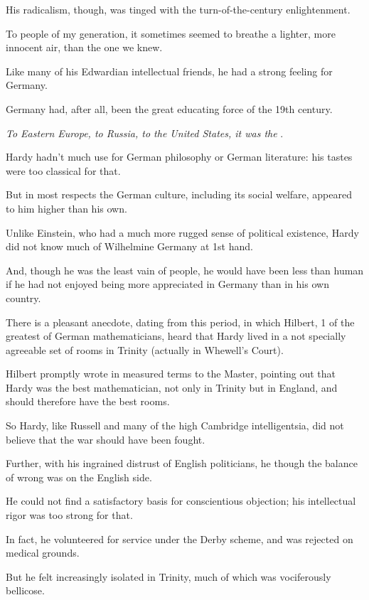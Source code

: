 \documentclass{article}
\numberwithin{equation}{section}
\begin{document}
His radicalism, though, was tinged with the turn-of-the-century enlightenment.

To people of my generation, it sometimes seemed to breathe a lighter, more innocent air, than the one we knew.

%
Like many of his Edwardian intellectual friends, he had a strong feeling for Germany.

Germany had, after all, been the great educating force of the 19th century.

\textit{To Eastern Europe, to Russia, to the United States, it was the }.

Hardy hadn't much use for German philosophy or German literature: his tastes were too classical for that.

But in most respects the German culture, including its social welfare, appeared to him higher than his own.

%
Unlike Einstein, who had a much more rugged sense of political existence, Hardy did not know much of Wilhelmine Germany at 1st hand.

And, though he was the least vain of people, he would have been less than human if he had not enjoyed being more appreciated in Germany than in his own country.

There is a pleasant anecdote, dating from this period, in which Hilbert, 1 of the greatest of German mathematicians, heard that Hardy lived in a not specially agreeable set of rooms in Trinity (actually in Whewell's Court).

Hilbert promptly wrote in measured terms to the Master, pointing out that Hardy was the best mathematician, not only in Trinity but in England, and should therefore have the best rooms.

%
So Hardy, like Russell and many of the high Cambridge intelligentsia, did not believe that the war should have been fought.

Further, with his ingrained distrust of English politicians, he though the balance of wrong was on the English side.

He could not find a satisfactory basis for conscientious objection; his intellectual rigor was too strong for that.

In fact, he volunteered for service under the Derby scheme, and was rejected on medical grounds.

But he felt increasingly isolated in Trinity, much of which was vociferously bellicose.
\end{document}

